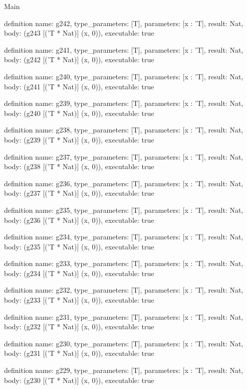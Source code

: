 \begin{lexlean}{Main}
\begin{semanticmodule}
definition{
  name: g242,
  type_parameters: [T],
  parameters: [x : 'T],
  result: Nat,
  body: (g243 [('T * Nat)] (x, 0)),
  executable: true
}

definition{
  name: g241,
  type_parameters: [T],
  parameters: [x : 'T],
  result: Nat,
  body: (g242 [('T * Nat)] (x, 0)),
  executable: true
}

definition{
  name: g240,
  type_parameters: [T],
  parameters: [x : 'T],
  result: Nat,
  body: (g241 [('T * Nat)] (x, 0)),
  executable: true
}

definition{
  name: g239,
  type_parameters: [T],
  parameters: [x : 'T],
  result: Nat,
  body: (g240 [('T * Nat)] (x, 0)),
  executable: true
}

definition{
  name: g238,
  type_parameters: [T],
  parameters: [x : 'T],
  result: Nat,
  body: (g239 [('T * Nat)] (x, 0)),
  executable: true
}

definition{
  name: g237,
  type_parameters: [T],
  parameters: [x : 'T],
  result: Nat,
  body: (g238 [('T * Nat)] (x, 0)),
  executable: true
}

definition{
  name: g236,
  type_parameters: [T],
  parameters: [x : 'T],
  result: Nat,
  body: (g237 [('T * Nat)] (x, 0)),
  executable: true
}

definition{
  name: g235,
  type_parameters: [T],
  parameters: [x : 'T],
  result: Nat,
  body: (g236 [('T * Nat)] (x, 0)),
  executable: true
}

definition{
  name: g234,
  type_parameters: [T],
  parameters: [x : 'T],
  result: Nat,
  body: (g235 [('T * Nat)] (x, 0)),
  executable: true
}

definition{
  name: g233,
  type_parameters: [T],
  parameters: [x : 'T],
  result: Nat,
  body: (g234 [('T * Nat)] (x, 0)),
  executable: true
}

definition{
  name: g232,
  type_parameters: [T],
  parameters: [x : 'T],
  result: Nat,
  body: (g233 [('T * Nat)] (x, 0)),
  executable: true
}

definition{
  name: g231,
  type_parameters: [T],
  parameters: [x : 'T],
  result: Nat,
  body: (g232 [('T * Nat)] (x, 0)),
  executable: true
}

definition{
  name: g230,
  type_parameters: [T],
  parameters: [x : 'T],
  result: Nat,
  body: (g231 [('T * Nat)] (x, 0)),
  executable: true
}

definition{
  name: g229,
  type_parameters: [T],
  parameters: [x : 'T],
  result: Nat,
  body: (g230 [('T * Nat)] (x, 0)),
  executable: true
}


\end{semanticmodule}
\end{lexlean}
